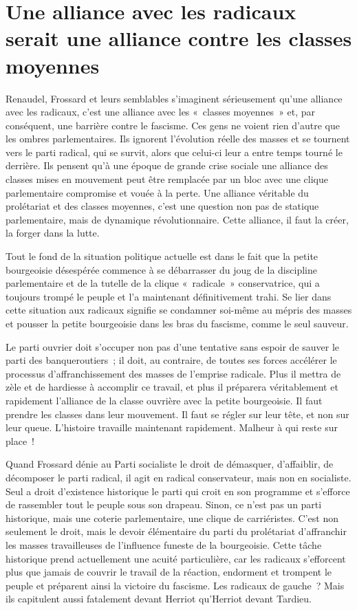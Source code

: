 \documentclass[french,twoside]{book} %
\begin{document}
\section[{Une alliance avec les radicaux serait une alliance contre les classes moyennes}]{Une alliance avec les radicaux serait une alliance contre les classes moyennes}
\noindent Renaudel, Frossard et leurs semblables s’imaginent sérieusement qu’une alliance avec les radicaux, c’est une alliance avec les « classes moyennes » et, par conséquent, une barrière contre le fascisme. Ces gens ne voient rien d’autre que les ombres parlementaires. Ils ignorent l’évolution  réelle des masses et se tournent vers le parti radical, qui se survit, alors que celui-ci leur a entre temps tourné le derrière. Ils pensent qu’à une époque de grande crise sociale une alliance des classes mises en mouvement peut être remplacée par un bloc avec une clique parlementaire compromise et vouée à la perte. Une alliance véritable du prolétariat et des classes moyennes, c’est une question non pas de statique parlementaire, mais de dynamique révolutionnaire. Cette alliance, il faut la créer, la forger dans la lutte.\par
Tout le fond de la situation politique actuelle est dans le fait que la petite bourgeoisie désespérée commence à se débarrasser du joug de la discipline parlementaire et de la tutelle de la clique « radicale » conservatrice, qui a toujours trompé le peuple et l’a maintenant définitivement trahi. Se lier dans cette situation aux radicaux signifie se condamner soi-même au mépris des masses et pousser la petite bourgeoisie dans les bras du fascisme, comme le seul sauveur.\par
Le parti ouvrier doit s’occuper non pas d’une tentative sans espoir de sauver le parti des banqueroutiers ; il doit, au contraire, de toutes ses forces accélérer le processus d’affranchissement des masses de l’emprise radicale. Plus il mettra de zèle et de hardiesse à accomplir ce travail, et plus il préparera véritablement et rapidement l’alliance de la classe ouvrière avec la petite bourgeoisie. Il faut prendre les classes dans leur mouvement. Il faut se régler sur leur tête, et non sur leur queue. L’histoire travaille maintenant rapidement. Malheur à qui reste sur place !\par
Quand Frossard dénie au Parti socialiste le droit de démasquer, d’affaiblir, de décomposer le parti radical, il agit en radical conservateur, mais non en socialiste. Seul a droit d’existence historique le parti qui croit en son programme et s’efforce de rassembler tout le peuple sous son drapeau. Sinon, ce n’est pas un parti historique, mais une  coterie parlementaire, une clique de carriéristes. C’est non seulement le droit, mais le devoir élémentaire du parti du prolétariat d’affranchir les masses travailleuses de l’influence funeste de la bourgeoisie. Cette tâche historique prend actuellement une acuité particulière, car les radicaux s’efforcent plus que jamais de couvrir le travail de la réaction, endorment et trompent le peuple et préparent ainsi la victoire du fascisme. Les radicaux de gauche ? Mais ils capitulent aussi fatalement devant Herriot qu’Herriot devant Tardieu.\par
\end{document}
